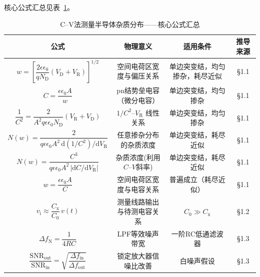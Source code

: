 核心公式汇总见表~\ref{tab:formulas}。

\begin{table}
\caption{C--V法测量半导体杂质分布——核心公式汇总}
\label{tab:formulas}
\begin{ruledtabular}
\begin{tabular}{cccc}
\hline
\multicolumn{1}{c}{\textbf{公式}} & \textbf{物理意义} & \textbf{适用条件} & \textbf{推导来源} \\
\hline

$w = \left[\dfrac{2\epsilon\epsilon_0}{qN_{\mathrm{D}}}(V_{\mathrm{D}} + V_{\mathrm{R}})\right]^{1/2}$
& 空间电荷区宽度与偏压关系
& 单边突变结，均匀掺杂，耗尽近似
& \S1.1 \\
\hline

$C = \dfrac{\epsilon\epsilon_0 A}{w}$
& pn结势垒电容（微分电容）
& 单边突变结，均匀掺杂
& \S1.1 \\
\hline

$\dfrac{1}{C^{2}} = \dfrac{2}{A^{2}q\epsilon\epsilon_0 N_{\mathrm{D}}}(V_{\mathrm{R}} + V_{\mathrm{D}})$
& $1/C^{2}$--$V_{\mathrm{R}}$ 线性关系
& 单边突变结，均匀掺杂
& \S1.1 \\
\hline

$N(w) = \dfrac{2}{q\epsilon\epsilon_0 A^{2}\,\mathrm{d}(1/C^{2})/\mathrm{d}V_{\mathrm{R}}}$
& 任意掺杂分布的杂质浓度
& 单边突变结，耗尽近似
& \S1.1 \\
\hline

$N(w) = \dfrac{C^{3}}{q\epsilon\epsilon_0 A^{2}\,|\mathrm{d}C/\mathrm{d}V_{\mathrm{R}}|}$
& 杂质浓度(利用$C$--$V$斜率)
& 单边突变结，耗尽近似
& \S1.1 \\
\hline

$w = \dfrac{\epsilon\epsilon_0 A}{C}$
& 空间电荷区宽度与电容关系
& 普遍成立（耗尽近似）
& \S1.1 \\
\hline

$v_{\mathrm{i}} \approx \dfrac{C_{\mathrm{x}}}{C_{0}}\,v(t)$
& 测量线路输出与待测电容关系
& $C_{0} \gg C_{\mathrm{x}}$
& \S1.2 \\
\hline

$\Delta f_{\mathrm{N}} = \dfrac{1}{4RC}$
& LPF等效噪声带宽
& 一阶RC低通滤波器
& \S1.3 \\
\hline

$\dfrac{\text{SNR}_{\text{out}}}{\text{SNR}_{\text{in}}} = \sqrt{\dfrac{\Delta f_{\text{in}}}{\Delta f_{\text{out}}}}$
& 锁定放大器信噪比改善
& 白噪声假设
& \S1.3 \\
\hline
\end{tabular}
\end{ruledtabular}
\end{table}

